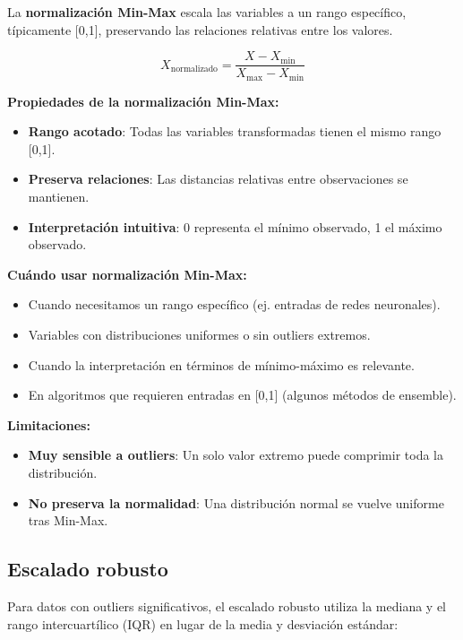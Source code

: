 \documentclass[
  letterpaper,
  DIV=11,
  numbers=noendperiod]{scrreprt}
\providecommand{\tightlist}{%
  \setlength{\itemsep}{0pt}\setlength{\parskip}{0pt}}
\begin{document}
La \textbf{normalización Min-Max} escala las variables a un rango
específico, típicamente {[}0,1{]}, preservando las relaciones relativas
entre los valores.

\[X_{\text{normalizado}} = \frac{X - X_{\text{min}}}{X_{\text{max}} - X_{\text{min}}}\]

\textbf{Propiedades de la normalización Min-Max:}

\begin{itemize}
\tightlist
\item
  \textbf{Rango acotado}: Todas las variables transformadas tienen el
  mismo rango {[}0,1{]}.
\item
  \textbf{Preserva relaciones}: Las distancias relativas entre
  observaciones se mantienen.
\item
  \textbf{Interpretación intuitiva}: 0 representa el mínimo observado, 1
  el máximo observado.
\end{itemize}

\textbf{Cuándo usar normalización Min-Max:}

\begin{itemize}
\tightlist
\item
  Cuando necesitamos un rango específico (ej. entradas de redes
  neuronales).
\item
  Variables con distribuciones uniformes o sin outliers extremos.
\item
  Cuando la interpretación en términos de mínimo-máximo es relevante.
\item
  En algoritmos que requieren entradas en {[}0,1{]} (algunos métodos de
  ensemble).
\end{itemize}

\textbf{Limitaciones:}

\begin{itemize}
\tightlist
\item
  \textbf{Muy sensible a outliers}: Un solo valor extremo puede
  comprimir toda la distribución.
\item
  \textbf{No preserva la normalidad}: Una distribución normal se vuelve
  uniforme tras Min-Max.
\end{itemize}

\subsection{Escalado robusto}\label{escalado-robusto}

Para datos con outliers significativos, el escalado robusto utiliza la
mediana y el rango intercuartílico (IQR) en lugar de la media y
desviación estándar:
\end{document}
